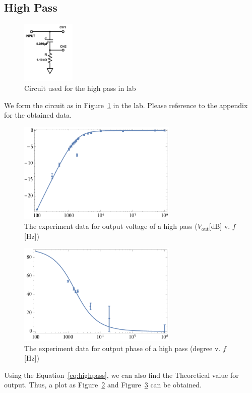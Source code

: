 \documentclass[aps,prl,reprint]{revtex4-1}
\begin{document}
    \subsection{High Pass}
        \begin{figure}[h]
            \centering
            \includegraphics[width=1in]{image/highpasslab.pdf}
            \caption{Circuit used for the high pass in lab}
            \label{fig:highpasslab}
        \end{figure}
        We form the circuit as in Figure~\ref{fig:highpasslab} in the lab. Please reference to the appendix for the obtained data.
        \begin{figure}[h]
            \centering
            \includegraphics[width=3in]{image/highpassvplot.pdf}
            \caption{The experiment data for output voltage of a high pass ($V_\text{out}$[dB] v. $f$[Hz])}
            \label{fig:highpassvplot}
        \end{figure}
        \begin{figure}[h]
            \centering
            \includegraphics[width=3in]{image/highpasspplot.pdf}
            \caption{The experiment data for output phase of a high pass (degree v. $f$[Hz])}
            \label{fig:highpasspplot}
        \end{figure}
        Using the Equation~\ref{eq:highpass}, we can also find the Theoretical value for output. Thus, a plot as Figure~\ref{fig:highpassvplot} and Figure~\ref{fig:highpasspplot} can be obtained.
\end{document}

